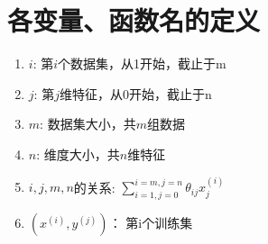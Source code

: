 \section{各变量、函数名的定义}
\begin{enumerate}
	\item $i$: 第$i$个数据集，从1开始，截止于m
	\item $j$: 第$j$维特征，从0开始，截止于n
	\item $m$: 数据集大小，共$m$组数据
	\item $n$: 维度大小，共$n$维特征
	\item $i, j, m, n$的关系: $\sum_{i=1, j=0}^{i=m, j=n}{\theta_{ij}x_j^{(i)}}$
	\item $(x^{(i)}, y^{(j)})$： 第i个训练集
\end{enumerate}